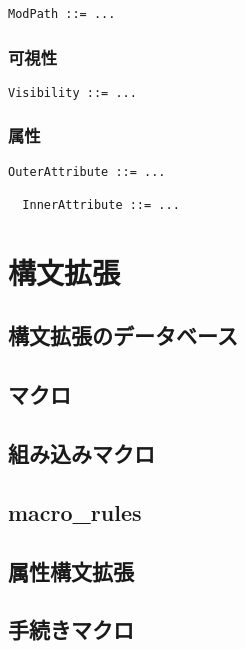 \documentclass[dvipdfmx,uplatex,papersize,a4paper,10pt]{jsbook}
\theoremstyle{definition}
\begin{document}
\begin{lstlisting}[language=BNFLike, gobble=2]
  ModPath ::= ...
\end{lstlisting}

\subsection{可視性}

\begin{lstlisting}[language=BNFLike, gobble=2]
  Visibility ::= ...
\end{lstlisting}

\subsection{属性}

\begin{lstlisting}[language=BNFLike, gobble=2]
  OuterAttribute ::= ...

  InnerAttribute ::= ...
\end{lstlisting}



\chapter{構文拡張}

\section{構文拡張のデータベース}

\section{マクロ}

\section{組み込みマクロ}

\section{macro\_rules}

\section{属性構文拡張}

\section{手続きマクロ}
\end{document}
